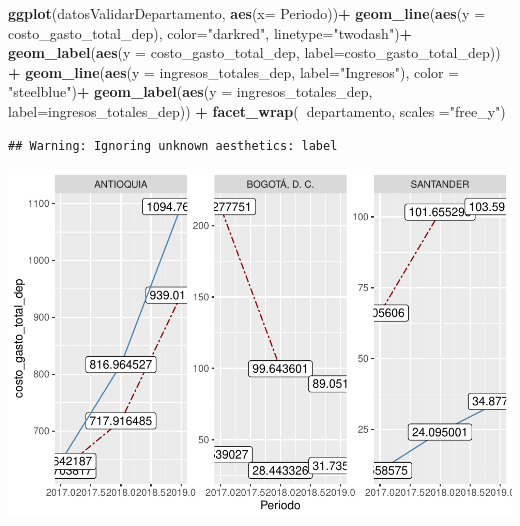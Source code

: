 \documentclass[
  11pt,
]{article}
\newenvironment{Shaded}{\begin{snugshade}}{\end{snugshade}}
\newcommand{\DataTypeTok}[1]{\textcolor[rgb]{0.13,0.29,0.53}{#1}}
\newcommand{\KeywordTok}[1]{\textcolor[rgb]{0.13,0.29,0.53}{\textbf{#1}}}
\newcommand{\NormalTok}[1]{#1}
\newcommand{\OperatorTok}[1]{\textcolor[rgb]{0.81,0.36,0.00}{\textbf{#1}}}
\newcommand{\StringTok}[1]{\textcolor[rgb]{0.31,0.60,0.02}{#1}}
\begin{document}
\begin{Shaded}
\begin{Highlighting}[]
\KeywordTok{ggplot}\NormalTok{(datosValidarDepartamento, }\KeywordTok{aes}\NormalTok{(}\DataTypeTok{x=}\NormalTok{ Periodo))}\OperatorTok{+}
\StringTok{  }\KeywordTok{geom_line}\NormalTok{(}\KeywordTok{aes}\NormalTok{(}\DataTypeTok{y =}\NormalTok{ costo_gasto_total_dep), }\DataTypeTok{color=}\StringTok{"darkred"}\NormalTok{, }\DataTypeTok{linetype=}\StringTok{"twodash"}\NormalTok{)}\OperatorTok{+}
\StringTok{  }\KeywordTok{geom_label}\NormalTok{(}\KeywordTok{aes}\NormalTok{(}\DataTypeTok{y =}\NormalTok{ costo_gasto_total_dep, }\DataTypeTok{label=}\NormalTok{costo_gasto_total_dep)) }\OperatorTok{+}\StringTok{ }
\StringTok{  }\KeywordTok{geom_line}\NormalTok{(}\KeywordTok{aes}\NormalTok{(}\DataTypeTok{y =}\NormalTok{ ingresos_totales_dep, }\DataTypeTok{label=}\StringTok{"Ingresos"}\NormalTok{), }\DataTypeTok{color =} \StringTok{"steelblue"}\NormalTok{)}\OperatorTok{+}
\StringTok{  }\KeywordTok{geom_label}\NormalTok{(}\KeywordTok{aes}\NormalTok{(}\DataTypeTok{y =}\NormalTok{ ingresos_totales_dep, }\DataTypeTok{label=}\NormalTok{ingresos_totales_dep)) }\OperatorTok{+}\StringTok{ }
\StringTok{  }\KeywordTok{facet_wrap}\NormalTok{(}\OperatorTok{~}\NormalTok{departamento, }\DataTypeTok{scales =}\StringTok{"free_y"}\NormalTok{)}
\end{Highlighting}
\end{Shaded}

\begin{verbatim}
## Warning: Ignoring unknown aesthetics: label
\end{verbatim}

\includegraphics{index_files/figure-latex/unnamed-chunk-31-1.pdf}
\end{document}
